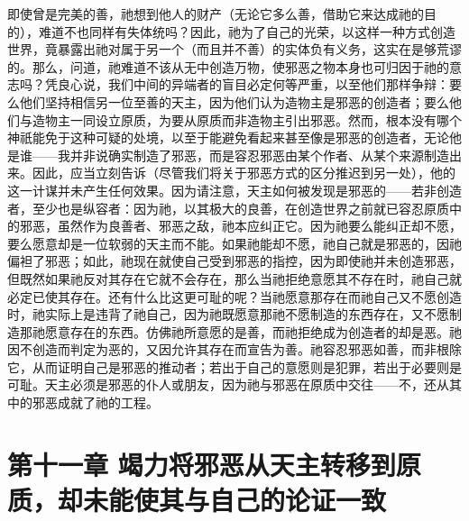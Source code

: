 即使曾是完美的善，祂想到他人的财产（无论它多么善，借助它来达成祂的目的），难道不也同样有失体统吗？因此，祂为了自己的光荣，以这样一种方式创造世界，竟暴露出祂对属于另一个（而且并不善）的实体负有义务，这实在是够荒谬的。那么，问道，祂难道不该从无中创造万物，使邪恶之物本身也可归因于祂的意志吗？凭良心说，我们中间的异端者的盲目必定何等严重，以至他们那样争辩：要么他们坚持相信另一位至善的天主，因为他们认为造物主是邪恶的创造者；要么他们与造物主一同设立原质，为要从原质而非造物主引出邪恶。然而，根本没有哪个神祇能免于这种可疑的处境，以至于能避免看起来甚至像是邪恶的创造者，无论他是谁——我并非说确实制造了邪恶，而是容忍邪恶由某个作者、从某个来源制造出来。因此，应当立刻告诉（尽管我们将关于邪恶方式的区分推迟到另一处），他的这一计谋并未产生任何效果。因为请注意，天主如何被发现是邪恶的——若非创造者，至少也是纵容者：因为祂，以其极大的良善，在创造世界之前就已容忍原质中的邪恶，虽然作为良善者、邪恶之敌，祂本应纠正它。因为祂要么能纠正却不愿，要么愿意却是一位软弱的天主而不能。如果祂能却不愿，祂自己就是邪恶的，因祂偏袒了邪恶；如此，祂现在就使自己受到邪恶的指控，因为即使祂并未创造邪恶，但既然如果祂反对其存在它就不会存在，那么当祂拒绝意愿其不存在时，祂自己就必定已使其存在。还有什么比这更可耻的呢？当祂愿意那存在而祂自己又不愿创造时，祂实际上是违背了祂自己，因为祂既愿意那祂不愿制造的东西存在，又不愿制造那祂愿意存在的东西。仿佛祂所意愿的是善，而祂拒绝成为创造者的却是恶。祂因不创造而判定为恶的，又因允许其存在而宣告为善。祂容忍邪恶如善，而非根除它，从而证明自己是邪恶的推动者；若出于自己的意愿则是犯罪，若出于必要则是可耻。天主必须是邪恶的仆人或朋友，因为祂与邪恶在原质中交往——不，还从其中的邪恶成就了祂的工程。\par


\section{第十一章  竭力将邪恶从天主转移到原质，却未能使其与自己的论证一致}

